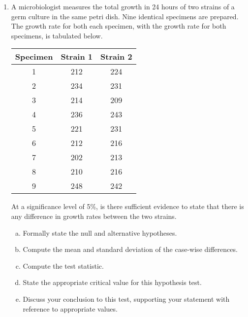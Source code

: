 \documentclass[a4paper,12pt]{article}
\begin{document}
\begin{enumerate}
\item A microbiologist measures the total growth in 24 hours of two strains of a germ culture in the same petri dish. Nine identical specimens are prepared. The growth rate for both each specimen, with the growth rate for both specimens, is tabulated below.
	
	\begin{center}
		\begin{tabular}{|c|c|c|} \hline 
			Specimen &	Strain 1	&	Strain 2	\\ \hline \hline
			1 & 212 & 224 \\ \hline
			2 & 234 & 231 \\ \hline
			3 & 214 & 209 \\ \hline
			4 & 236 & 243 \\ \hline
			5 & 221 & 231 \\ \hline 
			6 & 212 & 216 \\ \hline
			7 & 202 & 213 \\ \hline 
			8 & 210 & 216 \\ \hline
			9 & 248 & 242 \\ \hline
		\end{tabular} 
	\end{center}
	\noindent At a significance level of 5\%, is there sufficient evidence to state that there is any difference in growth rates between the two strains.
	
	

	
	\begin{enumerate}[(a)]
		\item Formally state the null and alternative hypotheses.
		\item Compute the mean and standard deviation of the case-wise differences.
		\item Compute the test statistic.
		\item State the appropriate critical value for this hypothesis test. 
		\item  Discuss your conclusion to this test, supporting your statement with reference to appropriate values.
	\end{enumerate}
\end{enumerate}


\medskip
\end{document}

